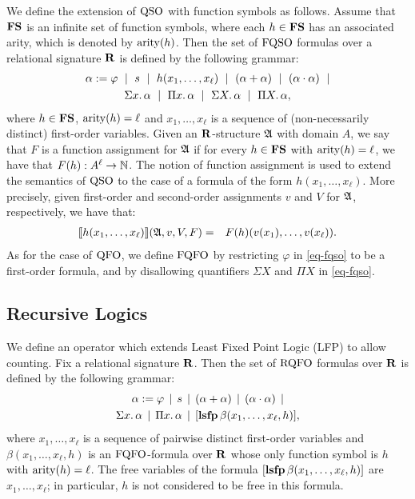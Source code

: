 
We define the extension of ${\rm QSO}$ with function symbols as follows. Assume that $\mathbf{FS}$ is an infinite set of function symbols, where each $h \in \mathbf{FS}$ has an associated arity, which is denoted by ${\rm arity}(h)$. Then the set of ${\rm FQSO}$ formulas over a relational signature $\mathbf{R}$ is defined by the following grammar:
\begin{multline}
\label{eq-fqso}
	\alpha := \varphi \ \mid \  s \  \mid \  h(x_1, \ldots, x_\ell) \  \mid \
	(\alpha \add \alpha) \  \mid\  (\alpha \mult \alpha) \  \mid \\  
	\sa{x} \alpha \  \mid \
	\pa{x} \alpha \  \mid \
	\sa{X} \alpha \  \mid \
	\pa{X} \alpha,
\end{multline}
where $h \in \mathbf{FS}$, ${\rm arity}(h) = \ell$ and $x_1, \ldots, x_\ell$ is a sequence of (non-necessarily distinct) first-order variables. Given an $\mathbf{R}$-structure $\mathfrak{A}$ with domain $A$, we say that $F$ is a function assignment for $\mathfrak{A}$ if for every $h \in \mathbf{FS}$ with ${\rm arity}(h) = \ell$, we have that $F(h) :  A^\ell \to \mathbb{N}$. The notion of function assignment is used to extend the semantics of ${\rm QSO}$ to the case of a formula of the form $h(x_1, \ldots, x_\ell)$. More precisely, given first-order and second-order assignments $v$ and $V$ for $\mathfrak{A}$, respectively, 
we have that:
\begin{eqnarray*}
{\llbracket{}{h(x_1, \ldots, x_\ell)}\rrbracket}(\mathfrak{A},v,V,F) & = & F(h)(v(x_1),\ldots, v(x_\ell)).
\end{eqnarray*}
As for the case of ${\rm QFO}$, we define ${\rm FQFO}$ by restricting $\varphi$ in \eqref{eq-fqso} to be a first-order formula, and by disallowing quantifiers $\Sigma X$ and $\Pi X$ in \eqref{eq-fqso}. 


\subsection{Recursive Logics}

We define an operator which extends Least Fixed Point Logic (LFP) \cite{I86,vardi1982complexity} to allow counting. 
Fix a relational signature $\mathbf{R}$. Then the set of ${\rm RQFO}$ formulas over $\mathbf{R}$ is defined by the following grammar:
\begin{multline*}
	\alpha := \varphi \, \mid \, s \, \mid \, (\alpha + \alpha) \, \mid\, (\alpha \cdot \alpha) \, \mid \\
	\Sigma{x}.\, \alpha \, \mid\, 
	\Pi{x}.\, \alpha \, \mid\,
	[{\bf lsfp} \, \beta(x_1, \ldots, x_\ell, h)],
\end{multline*}
where $x_1, \ldots, x_\ell$ is a sequence of pairwise distinct first-order variables and $\beta(x_1, \ldots, x_\ell, h)$ is an ${\rm FQFO}$-formula over $\mathbf{R}$ whose only function symbol is $h$ with ${\rm arity}(h) = \ell$. The free variables of the formula $[{\bf lsfp} \, \beta(x_1,\ldots,x_\ell,h)]$ are $x_1, \ldots, x_\ell$; in particular, $h$ is not considered to be free in this formula.

